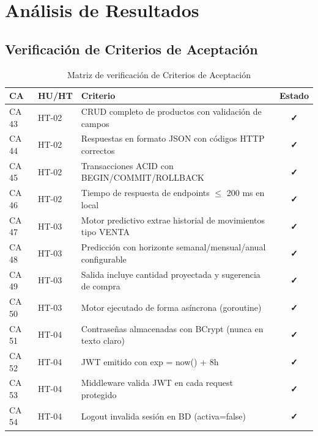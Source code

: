\documentclass[12pt,a4paper,oneside]{report}
\begin{document}
\chapter{Análisis de Resultados}

\section{Verificación de Criterios de Aceptación}

\begin{table}[H]
\centering
\caption{Matriz de verificación de Criterios de Aceptación}
\begin{tabularx}{\textwidth}{|l|l|X|c|}
\hline
\rowcolor{lightgray}
\textbf{CA} & \textbf{HU/HT} & \textbf{Criterio} & \textbf{Estado} \\
\hline
CA 43 & HT-02 & CRUD completo de productos con validación de campos & \textcolor{successgreen}{\textbf{✓}} \\
\hline
CA 44 & HT-02 & Respuestas en formato JSON con códigos HTTP correctos & \textcolor{successgreen}{\textbf{✓}} \\
\hline
CA 45 & HT-02 & Transacciones ACID con BEGIN/COMMIT/ROLLBACK & \textcolor{successgreen}{\textbf{✓}} \\
\hline
CA 46 & HT-02 & Tiempo de respuesta de endpoints $\leq$ 200 ms en local & \textcolor{successgreen}{\textbf{✓}} \\
\hline
CA 47 & HT-03 & Motor predictivo extrae historial de movimientos tipo VENTA & \textcolor{successgreen}{\textbf{✓}} \\
\hline
CA 48 & HT-03 & Predicción con horizonte semanal/mensual/anual configurable & \textcolor{successgreen}{\textbf{✓}} \\
\hline
CA 49 & HT-03 & Salida incluye cantidad proyectada y sugerencia de compra & \textcolor{successgreen}{\textbf{✓}} \\
\hline
CA 50 & HT-03 & Motor ejecutado de forma asíncrona (goroutine) & \textcolor{successgreen}{\textbf{✓}} \\
\hline
CA 51 & HT-04 & Contraseñas almacenadas con BCrypt (nunca en texto claro) & \textcolor{successgreen}{\textbf{✓}} \\
\hline
CA 52 & HT-04 & JWT emitido con exp = now() + 8h & \textcolor{successgreen}{\textbf{✓}} \\
\hline
CA 53 & HT-04 & Middleware valida JWT en cada request protegido & \textcolor{successgreen}{\textbf{✓}} \\
\hline
CA 54 & HT-04 & Logout invalida sesión en BD (activa=false) & \textcolor{successgreen}{\textbf{✓}} \\

\end{tabularx}
\end{table}
\end{document}
